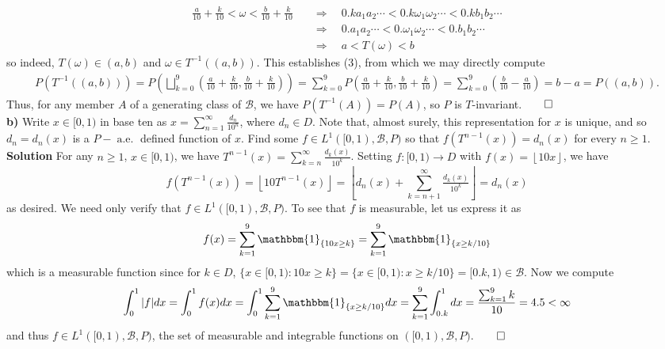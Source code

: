 \documentclass[10pt]{article}
\newcommand{\bp}[1]{\left({#1}\right)}
\newcommand{\1}[1]{\mathbbm{1}_{#1}}
\newcommand{\mc}[1]{\mathcal{#1}}
\newcommand*{\floor}[1]{\left\lfloor#1\right\rfloor}
\DeclareMathOperator{\ale}{a.e.}
\begin{document}
    \begin{align*}
        \tfrac{a}{10}+\tfrac{k}{10}<\omega<\tfrac{b}{10}+\tfrac{k}{10}\quad&\Rightarrow\quad 0.ka_1a_2\cdots <0.k\omega_1\omega_2\cdots <0.kb_1b_2\cdots\\
        &\Rightarrow\quad 0.a_1a_2\cdots <0.\omega_1\omega_2\cdots < 0.b_1b_2\cdots\\
        &\Rightarrow\quad a<T(\omega)<b
    \end{align*}
    so indeed, $T(\omega)\in(a,b)$ and $\omega\in T^{-1}((a,b))$. This establishes (3), from which we may directly compute
    \begin{align*}
        P(T^{-1}((a,b)))=P\bp{\bigsqcup_{k=0}^9\bp{\tfrac{a}{10}+\tfrac{k}{10},\tfrac{b}{10}+\tfrac{k}{10}}}=\sum_{k=0}^9P\bp{\tfrac{a}{10}+\tfrac{k}{10},\tfrac{b}{10}+\tfrac{k}{10}}=\sum_{k=0}^9\bp{\tfrac{b}{10}-\tfrac{a}{10}}=b-a=P((a,b)).
    \end{align*}
    Thus, for any member $A$ of a generating class of $\mc{B}$, we have $P(T^{-1}(A))=P(A)$, so $P$ is $T$-invariant.\hfill{$\qed$}\\[5pt]
    {\bf b)} Write $x\in[0,1)$ in base ten as $x=\sum_{n=1}^\infty\tfrac{d_n}{10^n}$, where $d_n\in D$. Note that, almost surely, this representation for $x$ is unique, and so $d_n=d_n(x)$ is a $P-\ale$ defined function of $x$. Find some $f\in L^{1}([0,1),\mc{B},P)$ so that $f(T^{n-1}(x))=d_n(x)$ for every $n\geq 1$.\\[5pt]
    {\bf Solution}\hspace{5pt} For any $n\geq 1$, $x\in[0,1)$, we have $T^{n-1}(x)=\sum_{k=n}^\infty\tfrac{d_k(x)}{10^k}$. Setting $f:[0,1)\rightarrow D$ with $f(x)=\floor{10x}$, we have
    \[f(T^{n-1}(x))=\floor{10T^{n-1}(x)}=\floor{d_n(x)+\sum_{k=n+1}^\infty\tfrac{d_k(x)}{10^k}}=d_n(x)\]
    as desired. We need only verify that $f\in L^1([0,1),\mc{B},P)$. To see that $f$ is measurable, let us express it as
    \begin{align*}
        f(x)=\sum_{k=1}^9\1{\{10x\geq k\}}=\sum_{k=1}^9\1{\{x\geq k/10\}}
    \end{align*}
    which is a measurable function since for $k\in D$, $\{x\in[0,1):10x\geq k\}=\{x\in[0,1):x\geq k/10\}=[0.k,1)\in\mc{B}$. Now we compute
    \begin{align*}
        \int_0^1|f|dx=\int_0^1f(x)dx=\int_0^1\sum_{k=1}^9\1{\{x\geq k/10\}}dx=\sum_{k=1}^9\int_{0.k}^1dx=\frac{\sum_{k=1}^9k}{10}=4.5<\infty
    \end{align*}
    and thus $f\in L^1([0,1),\mc{B},P)$, the set of measurable and integrable functions on $([0,1),\mc{B},P)$.\hfill{$\qed$}\\[5pt]
\end{document}
